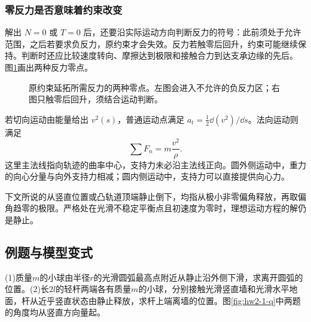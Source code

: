 \subsubsection{零反力是否意味着约束改变}
解出 $N=0$ 或 $T=0$ 后，还要沿实际运动方向判断反力的符号：此前须处于允许范围，之后若要求负反力，原约束才会失效。反力若触零后回升，约束可能继续保持。判断时还应比较速度转向、摩擦达到极限和接触合力到达支承边缘的先后。
图\ref{sup2:fig:d2-zero-test}画出两种反力零点。
\begin{figure}[H]\centering
{}
\caption{原约束延拓所需反力的两种零点。左图会进入不允许的负反力区；右图只触零后回升，须结合运动判断。}\label{sup2:fig:d2-zero-test}
\end{figure}

若切向运动由能量给出 $v^2(s)$，普通运动点满足 $a_t=\tfrac12\dd(v^2)/\dd s$。法向运动则满足
\[
\sum F_n=m\frac{v^2}{\rho}.
\]
这里主法线指向轨迹的曲率中心，支持力未必沿主法线正向。圆外侧运动中，重力的向心分量与向外支持力相减；圆内侧运动中，支持力可以直接提供向心力。

下文所说的从竖直位置或凸轨道顶端静止倒下，均指从极小非零偏角释放，再取偏角趋零的极限。严格处在光滑不稳定平衡点且初速度为零时，理想运动方程的解仍是静止。


\subsection{例题与模型变式}

\begin{example}[圆弧与端点质量杆的分离]\label{ex:hw2-1}

(1)质量$m$的小球由半径$r$的光滑圆弧最高点附近从静止沿外侧下滑，求离开圆弧的位置。(2)长$2l$的轻杆两端各有质量$m$的小球，分别接触光滑竖直墙和光滑水平地面，杆从近乎竖直状态由静止释放，求杆上端离墙的位置。图\ref{fig:hw2-1-q}中两题的角度均从竖直方向量起。

\end{example}


